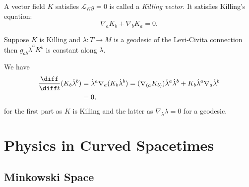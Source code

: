 \documentclass[12pt]{article}
\begin{document}
\begin{definition}
	A vector field $K$ satisfies $\mathcal{L}_K g = 0$ is called a \emph{Killing vector}. It satisfies Killing's equation:
	\[
	\nabla_a K_b + \nabla_b K_a = 0.
	\]
\end{definition}

\begin{lemma}
	Suppose $K$ is Killing and $\lambda : T \to M$ is a geodesic of the Levi-Civita connection then $g_{ab} \dot \lambda ^a K^b$ is constant along $\lambda$.
\end{lemma}

\begin{proofbox}
	We have
	\begin{align*}
		\frac{\diff}{\diff t} (K_b \dot \lambda^b) &= \dot \lambda^a \nabla_a (K_b \dot \lambda^b) = (\nabla_{(a}K_{b)}) \dot \lambda^a \dot \lambda^b + K_b \dot \lambda^a \nabla_a \dot \lambda^b \\
							   &= 0,
	\end{align*}
	for the first part as $K$ is Killing and the latter as $\nabla_\lambda \lambda = 0$ for a geodesic.
\end{proofbox}


\newpage

\section{Physics in Curved Spacetimes}%
\label{sec:phys}

\subsection{Minkowski Space}%
\label{sub:ms}
\end{document}
